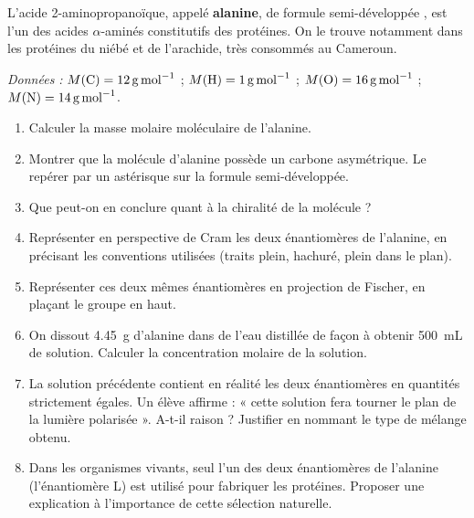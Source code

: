 \documentclass[11pt]{article}
\begin{document}
\begin{exercice}
L'acide 2-aminopropanoïque, appelé \textbf{alanine}, de formule semi-développée , est l'un des acides $\alpha$-aminés constitutifs des protéines. On le trouve notamment dans les protéines du niébé et de l'arachide, très consommés au Cameroun.

\medskip
\emph{Données :} $M(\ce{C}) = \SI{12}{g.mol^{-1}}$ ; $M(\ce{H}) = \SI{1}{g.mol^{-1}}$ ; $M(\ce{O}) = \SI{16}{g.mol^{-1}}$ ; $M(\ce{N}) = \SI{14}{g.mol^{-1}}$.

\begin{enumerate}
\item Calculer la masse molaire moléculaire de l'alanine.
\item Montrer que la molécule d'alanine possède un carbone asymétrique. Le repérer par un astérisque sur la formule semi-développée.
\item Que peut-on en conclure quant à la chiralité de la molécule ?
\item Représenter en perspective de Cram les deux énantiomères de l'alanine, en précisant les conventions utilisées (traits plein, hachuré, plein dans le plan).
\item Représenter ces deux mêmes énantiomères en projection de Fischer, en plaçant le groupe  en haut.
\item On dissout \SI{4,45}{g} d'alanine dans de l'eau distillée de façon à obtenir \SI{500}{mL} de solution. Calculer la concentration molaire de la solution.
\item La solution précédente contient en réalité les deux énantiomères en quantités strictement égales. Un élève affirme : « cette solution fera tourner le plan de la lumière polarisée ». A-t-il raison ? Justifier en nommant le type de mélange obtenu.
\item Dans les organismes vivants, seul l'un des deux énantiomères de l'alanine (l'énantiomère L) est utilisé pour fabriquer les protéines. Proposer une explication à l'importance de cette sélection naturelle.
\end{enumerate}
\end{exercice}
\end{document}
